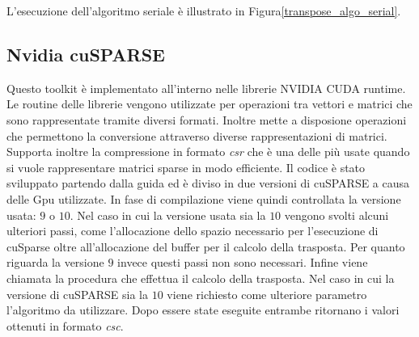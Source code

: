 \documentclass[]{IEEEtran}
\begin{document}
L'esecuzione dell'algoritmo seriale è illustrato in Figura\ref{transpose_algo_serial}.

	
	\subsection{Nvidia cuSPARSE}
	Questo toolkit è implementato all'interno nelle librerie NVIDIA CUDA runtime. Le routine delle librerie vengono utilizzate per operazioni tra vettori e matrici che sono rappresentate tramite diversi formati. Inoltre mette a disposione operazioni che permettono la conversione attraverso diverse rappresentazioni di matrici. Supporta inoltre la compressione in formato \textit{csr} che è una delle più usate quando si vuole rappresentare matrici sparse in modo efficiente.\newline	
	Il codice è stato sviluppato partendo dalla guida \cite{cusparse} ed è diviso in due versioni di cuSPARSE a causa delle Gpu utilizzate. In fase di compilazione viene quindi controllata la versione usata: $ 9 $ o $ 10 $.\newline
	Nel caso in cui la versione usata sia la $ 10 $ vengono svolti alcuni ulteriori passi, come l'allocazione dello spazio necessario per l'esecuzione di cuSparse oltre all'allocazione del buffer per il calcolo della trasposta. Per quanto riguarda la versione $ 9 $ invece questi passi non sono necessari.\newline
	Infine viene chiamata la procedura che effettua il calcolo della trasposta. Nel caso in cui la versione di cuSPARSE sia la $ 10 $ viene richiesto come ulteriore parametro l'algoritmo da utilizzare.\newline
	Dopo essere state eseguite entrambe ritornano i valori ottenuti in formato \textit{csc}.
\end{document}
